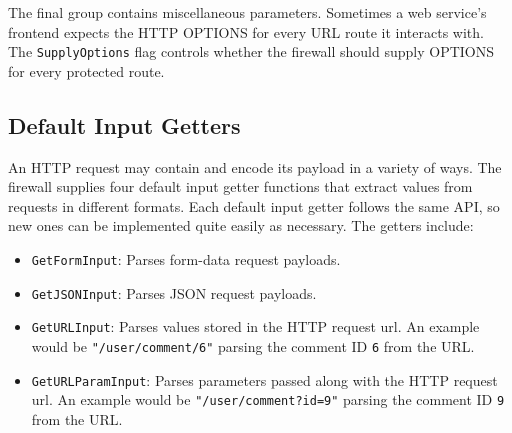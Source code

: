 
The final group contains miscellaneous parameters. Sometimes a web service's frontend expects the HTTP OPTIONS for every URL route it interacts with. The \lstinline{SupplyOptions} flag controls whether the firewall should supply OPTIONS for every protected route.








\subsection{Default Input Getters}\label{Sec:DefaultInputGetters}

An HTTP request may contain and encode its payload in a variety of ways. The firewall supplies four default input getter functions that extract values from requests in different formats. Each default input getter follows the same API, so new ones can be implemented quite easily as necessary. The getters include:

\begin{itemize}[nosep]
\item \lstinline{GetFormInput}: Parses form-data request payloads.

\item \lstinline{GetJSONInput}: Parses JSON request payloads.

\item \lstinline{GetURLInput}: Parses values stored in the HTTP request url. An example would be \lstinline{"/user/comment/6"} parsing the comment ID \lstinline{6} from the URL.

\item \lstinline{GetURLParamInput}: Parses parameters passed along with the HTTP request url. An example would be \lstinline{"/user/comment?id=9"} parsing the comment ID \lstinline{9} from the URL.

\end{itemize}

